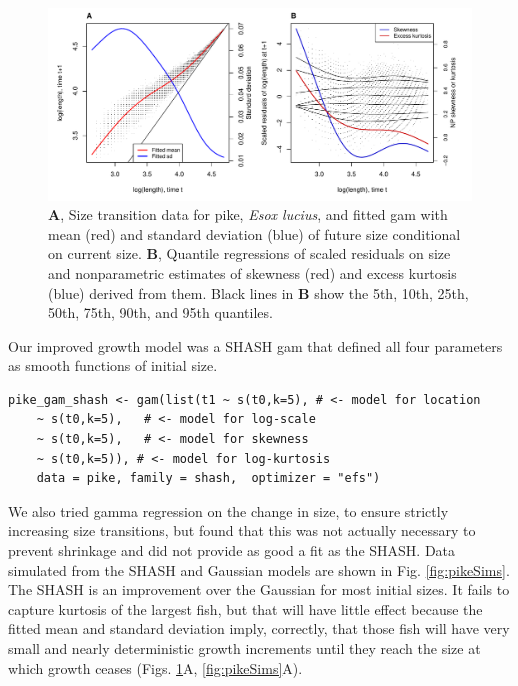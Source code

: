 \documentclass[12pt]{article}
\begin{document}
\begin{spacing}{1.35}
\begin{figure}[tbp]
	\centering
	\includegraphics[width=1.0\textwidth]{figures/pike_resid_diagnostics.pdf}
	\caption{\textbf{A}, Size transition data for pike, \emph{Esox lucius}, and fitted gam with mean (red) and standard deviation (blue) of future size conditional on current size.  \textbf{B}, Quantile regressions of scaled residuals on size and nonparametric estimates of skewness (red) and excess kurtosis (blue) derived from them. Black lines in \textbf{B} show the 5th, 10th, 25th, 50th, 75th, 90th, and 95th quantiles.}
	\label{fig:pike_diagnostics}
\end{figure} 

Our improved growth model was a SHASH gam that defined all four parameters as smooth functions of initial size.
\begin{lstlisting}
pike_gam_shash <- gam(list(t1 ~ s(t0,k=5), # <- model for location 
	~ s(t0,k=5),   # <- model for log-scale
	~ s(t0,k=5),   # <- model for skewness
	~ s(t0,k=5)), # <- model for log-kurtosis
	data = pike, family = shash,  optimizer = "efs")
\end{lstlisting}
We also tried gamma regression on the change in size, to ensure strictly increasing size transitions, but found that this was not actually necessary to prevent shrinkage and did not provide as good a fit as the SHASH. 
Data simulated from the SHASH and Gaussian models are shown in Fig. \ref{fig:pikeSims}. 
The SHASH is an improvement over the Gaussian for most initial sizes. 
It fails to capture kurtosis of the largest fish, but that will have little effect because the fitted mean and standard deviation imply, correctly, that those
fish will have very small and nearly deterministic growth increments until they reach the size at which growth ceases (Figs. \ref{fig:pike_diagnostics}A, \ref{fig:pikeSims}A).  


\end{spacing}
\end{document}

